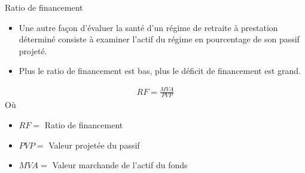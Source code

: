 \documentclass[10pt,a4paper]{beamer}
\begin{document}
\begin{frame}{Ratio de financement}
\begin{itemize}[label=\bullet]
\item Une autre façon d’évaluer la santé d’un régime de retraite à prestation déterminé consiste à examiner l’actif du régime en pourcentage de son passif projeté.
\item Plus le ratio de financement est bas, plus le déficit de financement est grand.
\end{itemize}
\begin{align*}
RF=\frac{MVA}{PVP}
\end{align*}
Où
\begin{itemize}[label=\bullet]
\item $RF=$ Ratio de financement
\item $PVP=$ Valeur projetée du passif
\item $MVA=$ Valeur marchande de l'actif du fonds
\end{itemize}
\end{frame}
\end{document}
